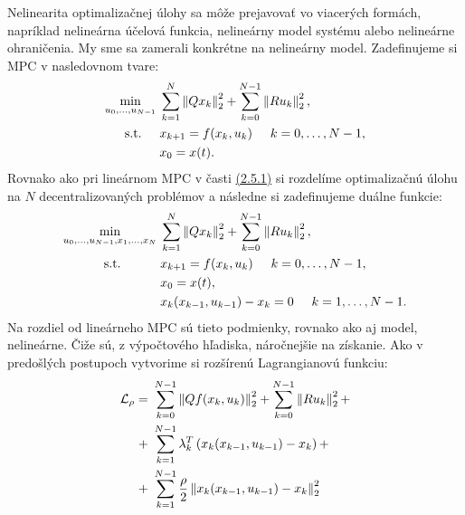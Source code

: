 Nelinearita optimalizačnej úlohy sa môže prejavovať vo viacerých formách, napríklad nelineárna účelová funkcia, nelineárny model systému alebo nelineárne ohraničenia. My sme sa zamerali konkrétne na nelineárny model. 
Zadefinujeme si MPC v nasledovnom tvare:
\begin{subequations}
	\begin{align}
	\displaystyle \min_{u_0,...,u_{N-1}} \hspace{0.1cm} &\sum_{k=1}^{N}\left\lVert Qx_k\right\rVert^{2}_{2}+\sum_{k=0}^{N-1}\left\lVert Ru_k\right\rVert^{2}_{2},\\
	\textrm{s.t.} \hspace{0.5cm} & x_{k+1} = f(x_{k},u_{k})\hspace{0.5cm} k=0,\dots,N-1,\\
	& x_{0} = x(t).
	\end{align}
\end{subequations}
Rovnako ako pri lineárnom MPC v časti \hyperref[math:ADMM_MPC]{(2.5.1)} si rozdelíme optimalizačnú úlohu na $N$ decentralizovaných problémov a následne si zadefinujeme duálne funkcie:
\begin{subequations}
	\begin{align}
	\displaystyle \min_{u_0,...,u_{N-1},x_1,...,x_N}\hspace{0.1cm} & 
	\sum_{k=1}^{N}
	\left\lVert
		Qx_k
	\right\rVert^{2}_{2}
	+
	\sum_{k=0}^{N-1}\left\lVert
		Ru_k
	\right\rVert^{2}_{2},\\
	\textrm{s.t.} \hspace{1.1cm} & x_{k+1} = f(x_{k},u_{k})\hspace{0.5cm} k=0,\dots,N-1,\\
	& x_{0} = x(t),\\
	& x_{k}(x_{k-1},u_{k-1})- x_{k} = 0 \hspace{0.5cm} k=1,\dots,N-1.
	\end{align}
\end{subequations}
Na rozdiel od lineárneho MPC sú tieto podmienky, rovnako ako aj model, nelineárne. Čiže sú, z výpočtového hľadiska, náročnejšie na získanie. Ako v predošlých postupoch vytvorime si rozšírenú Lagrangianovú funkciu:
\begin{equation}
\begin{split}
\mathcal{L}_{\rho} =&~ \sum_{k=0}^{N-1}
\left\lVert
	Qf(x_{k},u_{k})
\right\rVert^{2}_{2}
+
\sum_{k=0}^{N-1}\left\lVert
	Ru_k
\right\rVert^{2}_{2}+\\+&~\sum_{k=1}^{N-1}\lambda_{k}^{T}\left( x_{k}(x_{k-1},u_{k-1}) - x_{k} \right) +\\+&~\sum_{k=1}^{N-1}\frac{\rho}{2} \left\lVert x_{k}(x_{k-1},u_{k-1}) - x_{k}\right\rVert_{2}^{2}
\end{split}
\end{equation}
